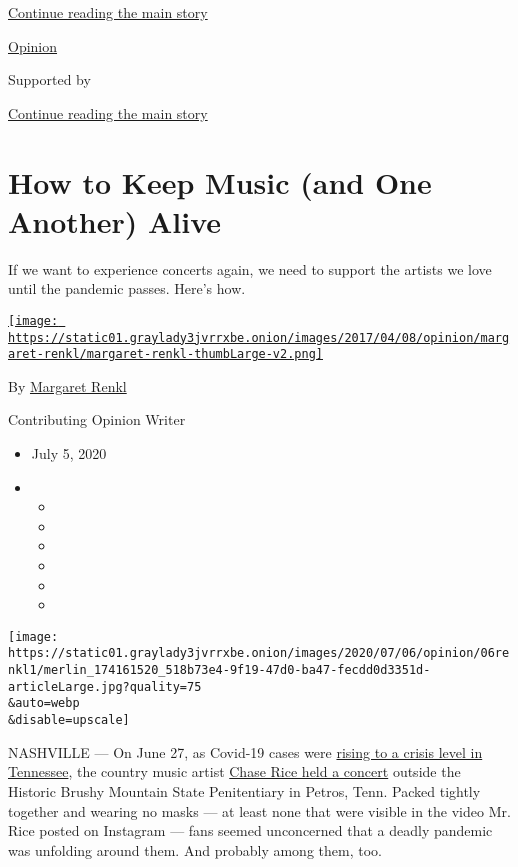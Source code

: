 \protect\hyperlink{after-top}{Continue reading the main story}

\href{/section/opinion}{Opinion}

Supported by

\protect\hyperlink{after-sponsor}{Continue reading the main story}

\hypertarget{how-to-keep-music-and-one-another-alive}{%
\section{How to Keep Music (and One Another)
Alive}\label{how-to-keep-music-and-one-another-alive}}

If we want to experience concerts again, we need to support the artists
we love until the pandemic passes. Here's how.

\href{https://www.nytimes3xbfgragh.onion/by/margaret-renkl}{\texttt{[image: https://static01.graylady3jvrrxbe.onion/images/2017/04/08/opinion/margaret-renkl/margaret-renkl-thumbLarge-v2.png]}}

By \href{https://www.nytimes3xbfgragh.onion/by/margaret-renkl}{Margaret
Renkl}

Contributing Opinion Writer

\begin{itemize}
\item
  July 5, 2020
\item
  \begin{itemize}
  \item
  \item
  \item
  \item
  \item
  \item
  \end{itemize}
\end{itemize}

\texttt{[image: https://static01.graylady3jvrrxbe.onion/images/2020/07/06/opinion/06renkl1/merlin\_174161520\_518b73e4-9f19-47d0-ba47-fecdd0d3351d-articleLarge.jpg?quality=75\\\&auto=webp\\\&disable=upscale]}

NASHVILLE --- On June 27, as Covid-19 cases were
\href{https://wpln.org/post/following-high-case-counts-tennessees-pandemic-tracking-site-goes-down/?mc_cid=a2c6e0f2a3\&mc_eid=e952ad88f8}{rising
to a crisis level in Tennessee}, the country music artist
\href{https://www.tennessean.com/story/entertainment/music/2020/06/29/chase-rice-chris-janson-concerts-roil-nashvilles-ravaged-music-industry/3280563001/}{Chase
Rice held a concert} outside the Historic Brushy Mountain State
Penitentiary in Petros, Tenn. Packed tightly together and wearing no
masks --- at least none that were visible in the video Mr. Rice posted
on Instagram --- fans seemed unconcerned that a deadly pandemic was
unfolding around them. And probably among them, too.


